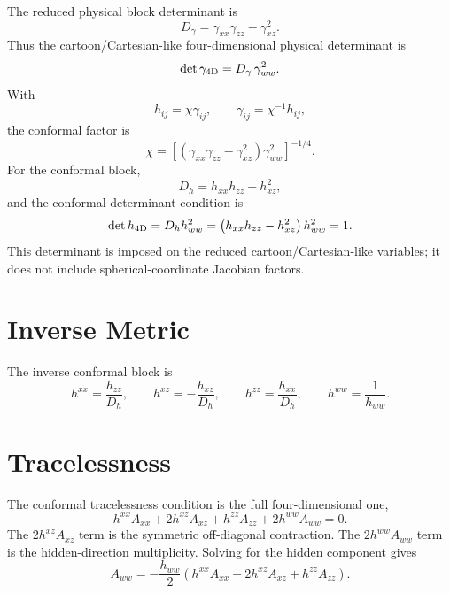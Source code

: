 \documentclass[11pt]{article}
\begin{document}
The reduced physical block determinant is
\begin{equation}
  D_\gamma
  =
  \gamma_{xx}\gamma_{zz}-\gamma_{xz}^2.
\end{equation}
Thus the cartoon/Cartesian-like four-dimensional physical determinant is
\begin{equation}
  \det\gamma_{\rm 4D}
  =
  D_\gamma\,\gamma_{ww}^2.
\end{equation}
With
\begin{equation}
  h_{ij}=\chi\gamma_{ij},
  \qquad
  \gamma_{ij}=\chi^{-1}h_{ij},
\end{equation}
the conformal factor is
\begin{equation}
  \chi
  =
  \left[
    \left(\gamma_{xx}\gamma_{zz}-\gamma_{xz}^2\right)
    \gamma_{ww}^2
  \right]^{-1/4}.
\end{equation}
For the conformal block,
\begin{equation}
  D_h
  =
  h_{xx}h_{zz}-h_{xz}^2,
\end{equation}
and the conformal determinant condition is
\begin{equation}
  \det h_{\rm 4D}
  =
  D_h h_{ww}^2
  =
  \left(h_{xx}h_{zz}-h_{xz}^2\right)h_{ww}^2
  =
  1.
\end{equation}
This determinant is imposed on the reduced cartoon/Cartesian-like variables;
it does not include spherical-coordinate Jacobian factors.

\section{Inverse Metric}

The inverse conformal block is
\begin{equation}
  h^{xx}=\frac{h_{zz}}{D_h},
  \qquad
  h^{xz}=-\frac{h_{xz}}{D_h},
  \qquad
  h^{zz}=\frac{h_{xx}}{D_h},
  \qquad
  h^{ww}=\frac{1}{h_{ww}}.
\end{equation}

\section{Tracelessness}

The conformal tracelessness condition is the full four-dimensional one,
\begin{equation}
  h^{xx}A_{xx}
  +
  2h^{xz}A_{xz}
  +
  h^{zz}A_{zz}
  +
  2h^{ww}A_{ww}
  =
  0.
\end{equation}
The \(2h^{xz}A_{xz}\) term is the symmetric off-diagonal contraction. The
\(2h^{ww}A_{ww}\) term is the hidden-direction multiplicity. Solving for the
hidden component gives
\begin{equation}
  A_{ww}
  =
  -\frac{h_{ww}}{2}
  \left(
    h^{xx}A_{xx}
    +
    2h^{xz}A_{xz}
    +
    h^{zz}A_{zz}
  \right).
\end{equation}
\end{document}
